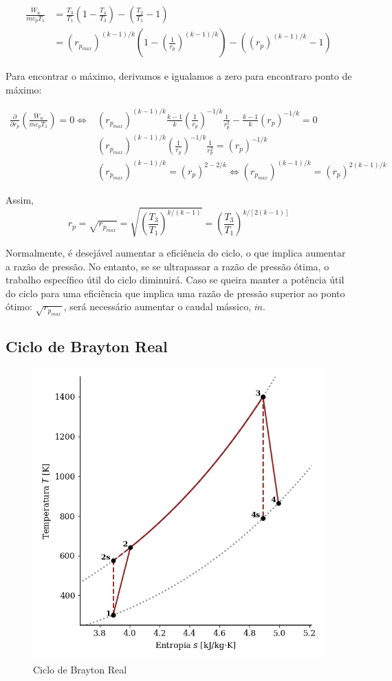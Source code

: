 \begin{equation*}
\begin{split}
    \frac{\dot{W}_u}{\dot{m} c_p T_1} & = \frac{T_3}{T_1} \left(1 - \frac{T_4}{T_3}\right) - \left(\frac{T_2}{T_1}-1\right)\\
    & = (r_{p_{max}})^{(k-1)/k} \left(1 - \left(\frac{1}{r_p}\right)^{(k-1)/k}\right) - \left((r_p)^{(k-1)/k} -1 \right)
\end{split}
\end{equation*}

Para encontrar o máximo, derivamos e igualamos a zero para encontraro ponto de máximo:

\begin{equation*}
\begin{split}
    \frac{\partial}{\partial r_p} \left( \frac{\dot{W}_u}{\dot{m} c_p T_1} \right) = 0 \Longleftrightarrow &  (r_{p_{max}})^{(k-1)/k} \frac{k-1}{k} \left(\frac{1}{r_p} \right)^{-1/k} \frac{1}{r_p^2} - \frac{k-1}{k} (r_p)^{-1/k} = 0 \\
    & (r_{p_{max}})^{(k-1)/k} \left(\frac{1}{r_p} \right)^{-1/k} \frac{1}{r_p^2} = (r_p)^{-1/k} \\
    & (r_{p_{max}})^{(k-1)/k} = (r_p)^{2-2/k} \Longleftrightarrow (r_{p_{max}})^{(k-1)/k} = (r_p)^{2(k-1)/k}
\end{split}
\end{equation*}

Assim,
\begin{equation}
    r_p = \sqrt{r_{p_{max}}} = \sqrt{\left(\frac{T_3}{T_1}\right)^{k/(k-1)}} = \left(\frac{T_3}{T_1}\right)^{k/[2(k-1)]}
\end{equation} 

Normalmente, é desejável aumentar a eficiência do ciclo, o que implica aumentar a razão de pressão. No entanto, se se ultrapassar a razão de pressão ótima, o trabalho específico útil do ciclo diminuirá. Caso se queira manter a potência útil do ciclo para uma eficiência que implica uma razão de pressão superior ao ponto ótimo: $\sqrt{r_{p_{max}}}$, será necessário aumentar o caudal mássico, $\dot{m}$.

\subsection{Ciclo de Brayton Real}

\begin{figure}[H]
    \centering
    \includegraphics[width=0.45\linewidth]{graphs/brayton-Ts-real.png}
    \caption{Ciclo de Brayton Real}
    \label{fig:brayton-Ts-real}
\end{figure}

